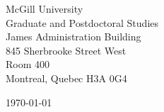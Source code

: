 \begin{minipage}{0.49\textwidth}
\begin{flushleft}
  \noindent
  McGill University\\
  Graduate and Postdoctoral Studies\\
  James Administration Building\\
  845 Sherbrooke Street West\\
  Room 400\\
  Montreal, Quebec H3A 0G4
\end{flushleft}
\end{minipage}
\begin{minipage}{0.47\textwidth}
\begin{flushright}
\today
\end{flushright}
\end{minipage} \\

\newcommand{\univ}{McGill University}
\newcommand{\univshort}{McGill}
\newcommand{\degree}{M.Sc.}
\newcommand{\dept}{Computer Science}




